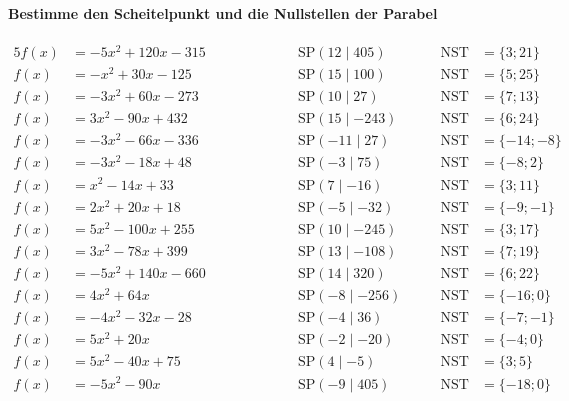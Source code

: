 \documentclass
[
  draft    = true,
  fontsize = 11pt,
  parskip  = half-,
  BCOR     = 0pt,
  DIV      = 11
]
{scrartcl}
\begin{document}
\paragraph{Bestimme den Scheitelpunkt und die Nullstellen der Parabel}
\begin{alignat*}{5}
  f(x)&=-5x^{2}+120x-315 \qquad&\qquad \quad&\text{SP}(12\mid405) \quad&\quad \text{NST}&=\{3;21\} \\[0.5ex]
  f(x)&=-x^{2}+30x-125 \qquad&\qquad \quad&\text{SP}(15\mid100) \quad&\quad \text{NST}&=\{5;25\} \\[0.5ex]
  f(x)&=-3x^{2}+60x-273 \qquad&\qquad \quad&\text{SP}(10\mid27) \quad&\quad \text{NST}&=\{7;13\} \\[0.5ex]
  f(x)&=3x^{2}-90x+432 \qquad&\qquad \quad&\text{SP}(15\mid-243) \quad&\quad \text{NST}&=\{6;24\} \\[0.5ex]
  f(x)&=-3x^{2}-66x-336 \qquad&\qquad \quad&\text{SP}(-11\mid27) \quad&\quad \text{NST}&=\{-14;-8\} \\[0.5ex]
  f(x)&=-3x^{2}-18x+48 \qquad&\qquad \quad&\text{SP}(-3\mid75) \quad&\quad \text{NST}&=\{-8;2\} \\[0.5ex]
  f(x)&=x^{2}-14x+33 \qquad&\qquad \quad&\text{SP}(7\mid-16) \quad&\quad \text{NST}&=\{3;11\} \\[0.5ex]
  f(x)&=2x^{2}+20x+18 \qquad&\qquad \quad&\text{SP}(-5\mid-32) \quad&\quad \text{NST}&=\{-9;-1\} \\[0.5ex]
  f(x)&=5x^{2}-100x+255 \qquad&\qquad \quad&\text{SP}(10\mid-245) \quad&\quad \text{NST}&=\{3;17\} \\[0.5ex]
  f(x)&=3x^{2}-78x+399 \qquad&\qquad \quad&\text{SP}(13\mid-108) \quad&\quad \text{NST}&=\{7;19\} \\[0.5ex]
  f(x)&=-5x^{2}+140x-660 \qquad&\qquad \quad&\text{SP}(14\mid320) \quad&\quad \text{NST}&=\{6;22\} \\[0.5ex]
  f(x)&=4x^{2}+64x \qquad&\qquad \quad&\text{SP}(-8\mid-256) \quad&\quad \text{NST}&=\{-16;0\} \\[0.5ex]
  f(x)&=-4x^{2}-32x-28 \qquad&\qquad \quad&\text{SP}(-4\mid36) \quad&\quad \text{NST}&=\{-7;-1\} \\[0.5ex]
  f(x)&=5x^{2}+20x \qquad&\qquad \quad&\text{SP}(-2\mid-20) \quad&\quad \text{NST}&=\{-4;0\} \\[0.5ex]
  f(x)&=5x^{2}-40x+75 \qquad&\qquad \quad&\text{SP}(4\mid-5) \quad&\quad \text{NST}&=\{3;5\} \\[0.5ex]
  f(x)&=-5x^{2}-90x \qquad&\qquad \quad&\text{SP}(-9\mid405) \quad&\quad \text{NST}&=\{-18;0\} \\[0.5ex]

\end{alignat*}
\end{document}
